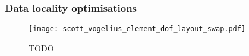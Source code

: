 \documentclass[thesis]{subfiles}
\begin{document}

\subsubsection{Data locality optimisations}
\label{sec:intro_mesh_numbering}




\begin{figure}
  \centering
  \texttt{[image: scott\_vogelius\_element\_dof\_layout\_swap.pdf]}
  \caption{
    TODO
  }
  \label{fig:scott_vogelius_element_dof_layout_swap}
\end{figure}




\end{document}

